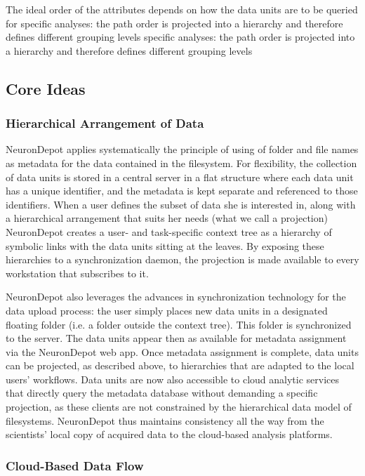\documentclass{frontiersSCNS} %
\begin{document}
The ideal order of the attributes depends on how the data units are to be
queried for specific analyses: the path order is projected into a hierarchy and
therefore defines different grouping levels specific analyses: the path order
is projected into a hierarchy and therefore defines different grouping levels

\subsection{Core Ideas}
\subsubsection{Hierarchical Arrangement of Data}

NeuronDepot applies systematically the principle of using of folder and file
names as metadata for the data contained in the filesystem. For flexibility,
the collection of data units is stored in a central server in a flat structure
where each data unit has a unique identifier, and the metadata is kept separate
and referenced to those identifiers. When a user defines the subset of data she
is interested in, along with a hierarchical arrangement that suits her needs
(what we call a projection) NeuronDepot creates a user- and task-specific
context tree as a hierarchy of symbolic links with the data units sitting at
the leaves. By exposing these hierarchies to a synchronization daemon, the
projection is made available to every workstation that subscribes to it. 

NeuronDepot also leverages the advances in synchronization technology for the
data upload process: the user simply places new data units in a designated
floating folder (i.e. a folder outside the context tree). This folder is
synchronized to the server. The data units appear then as available for
metadata assignment via the NeuronDepot web app. Once metadata assignment is
complete, data units can be projected, as described above, to hierarchies that
are adapted to the local users' workflows. Data units are now also accessible
to cloud analytic services that directly query the metadata database without
demanding a specific projection, as these clients are not constrained by the
hierarchical data model of filesystems. NeuronDepot thus maintains consistency
all the way from the scientists' local copy of acquired data to the cloud-based
analysis platforms.


\subsubsection{Cloud-Based Data Flow}
\end{document}
